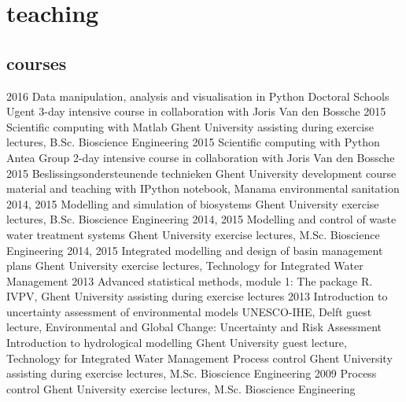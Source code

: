 \documentclass[]{stvhoey-cv}  %
\begin{document}
\section{teaching}
\subsection*{courses}
\begin{entrylist}
  \entry
    {2016}
    {Data manipulation, analysis and visualisation in Python}
    {Doctoral Schools Ugent}
    {3-day intensive course in collaboration with Joris Van den Bossche}
  \entry
    {2015}
    {Scientific computing with Matlab}
    {Ghent University}
    {assisting during exercise lectures, B.Sc. Bioscience Engineering}
  \entry
    {2015}
    {Scientific computing with Python}
    {Antea Group}
    {2-day intensive course in collaboration with Joris Van den Bossche}
  \entry
    {2015}
    {Beslissingsondersteunende technieken}
    {Ghent University}
    {development course material and teaching with IPython notebook, Manama environmental sanitation}
  \entry
    {2014, 2015}
    {Modelling and simulation of biosystems}
    {Ghent University}
    {exercise lectures, B.Sc. Bioscience Engineering}
   \entry
    {2014, 2015} %
    {Modelling and control of waste water treatment systems}
    {Ghent University}
    {exercise lectures, M.Sc. Bioscience Engineering}
   \entry
    {2014, 2015}%
    {Integrated modelling and design of basin management plans}
    {Ghent University}
    {exercise lectures, Technology for Integrated Water Management}
   \entry
    {2013}
    {Advanced statistical methods, module 1: The package R.}
    {IVPV, Ghent University}
    {assisting during exercise lectures}
   \entry
    {2013}
    {Introduction to uncertainty assessment of environmental models}
    {UNESCO-IHE, Delft}
    {guest lecture, Environmental and Global Change: Uncertainty and Risk Assessment}
   \entry
    {}
    {Introduction to hydrological modelling}
    {Ghent University}
    {guest lecture, Technology for Integrated Water Management}
   \entry
	{} %
    {Process control}
    {Ghent University}
    {assisting during exercise lectures, M.Sc. Bioscience Engineering}
   \entry
    {2009}
    {Process control}
    {Ghent University}
    {exercise lectures, M.Sc. Bioscience Engineering}
\end{entrylist}
\end{document}
